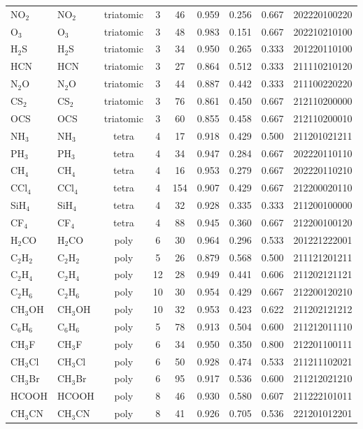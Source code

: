 \documentclass[11pt,a4paper]{article}
\theoremstyle{definition}
\theoremstyle{remark}
\begin{document}
\begin{longtable}{llccccccl}
NO$_2$   & NO$_2$  & triatomic & 3 & 46  & 0.959 & 0.256 & 0.667 & 202220100220 \\
O$_3$    & O$_3$   & triatomic & 3 & 48  & 0.983 & 0.151 & 0.667 & 202210210100 \\
H$_2$S   & H$_2$S  & triatomic & 3 & 34  & 0.950 & 0.265 & 0.333 & 201220110100 \\
HCN      & HCN     & triatomic & 3 & 27  & 0.864 & 0.512 & 0.333 & 211110210120 \\
N$_2$O   & N$_2$O  & triatomic & 3 & 44  & 0.887 & 0.442 & 0.333 & 211100220220 \\
CS$_2$   & CS$_2$  & triatomic & 3 & 76  & 0.861 & 0.450 & 0.667 & 212110200000 \\
OCS      & OCS     & triatomic & 3 & 60  & 0.855 & 0.458 & 0.667 & 212110200010 \\
\midrule
NH$_3$   & NH$_3$  & tetra & 4 & 17  & 0.918 & 0.429 & 0.500 & 211201021211 \\
PH$_3$   & PH$_3$  & tetra & 4 & 34  & 0.947 & 0.284 & 0.667 & 202220110110 \\
CH$_4$   & CH$_4$  & tetra & 4 & 16  & 0.953 & 0.279 & 0.667 & 202220110210 \\
CCl$_4$  & CCl$_4$ & tetra & 4 & 154 & 0.907 & 0.429 & 0.667 & 212200020110 \\
SiH$_4$  & SiH$_4$ & tetra & 4 & 32  & 0.928 & 0.335 & 0.333 & 211200100000 \\
CF$_4$   & CF$_4$  & tetra & 4 & 88  & 0.945 & 0.360 & 0.667 & 212200100120 \\
H$_2$CO  & H$_2$CO & poly  & 6 & 30  & 0.964 & 0.296 & 0.533 & 201221222001 \\
\midrule
C$_2$H$_2$  & C$_2$H$_2$  & poly & 5  & 26  & 0.879 & 0.568 & 0.500 & 211121201211 \\
C$_2$H$_4$  & C$_2$H$_4$  & poly & 12 & 28  & 0.949 & 0.441 & 0.606 & 211202121121 \\
C$_2$H$_6$  & C$_2$H$_6$  & poly & 10 & 30  & 0.954 & 0.429 & 0.667 & 212200120210 \\
CH$_3$OH    & CH$_3$OH    & poly & 10 & 32  & 0.953 & 0.423 & 0.622 & 211202121212 \\
C$_6$H$_6$  & C$_6$H$_6$  & poly & 5  & 78  & 0.913 & 0.504 & 0.600 & 211212011110 \\
CH$_3$F     & CH$_3$F     & poly & 6  & 34  & 0.950 & 0.350 & 0.800 & 212201100111 \\
CH$_3$Cl    & CH$_3$Cl    & poly & 6  & 50  & 0.928 & 0.474 & 0.533 & 211211102021 \\
CH$_3$Br    & CH$_3$Br    & poly & 6  & 95  & 0.917 & 0.536 & 0.600 & 211212021210 \\
HCOOH       & HCOOH       & poly & 8  & 46  & 0.930 & 0.580 & 0.607 & 211222101011 \\
CH$_3$CN    & CH$_3$CN    & poly & 8  & 41  & 0.926 & 0.705 & 0.536 & 221201012201 \\
\end{longtable}
\end{document}
